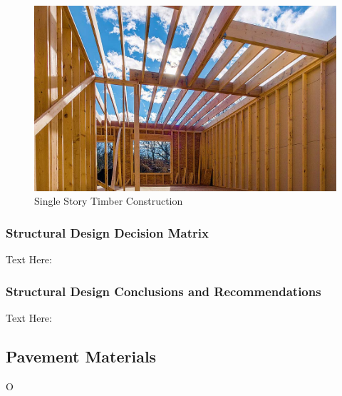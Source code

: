 \documentclass{ceri}
\begin{document}
\begin{figure}[H]
    \centering
    \includegraphics[width=.7\textwidth]{images/Structural3.png}
    \caption{Single Story Timber Construction}
    \label{fig:S_SSTC}
\end{figure}
\newpage
\subsubsection{Structural Design Decision Matrix}
Text Here:

\begin{table}[H]
\centering
\caption{Structural Design Decision Matrix}
\label{my-label}
\end{table}

\subsubsection{Structural Design Conclusions and Recommendations}
Text Here:
\newpage
\subsection{Pavement Materials}
O 
\end{document}
